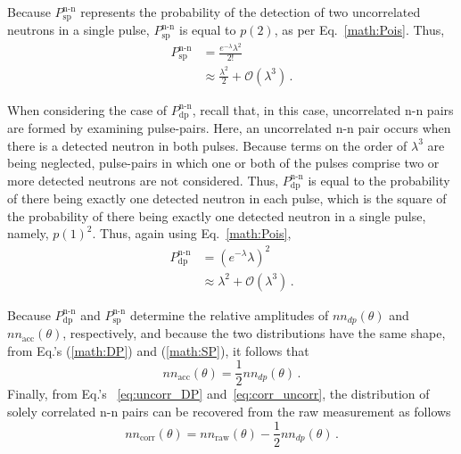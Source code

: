 Because $P^{\text{n-n}}_{\text{sp}}$ represents the probability of the detection of two uncorrelated neutrons in a single pulse, $P^{\text{n-n}}_{\text{sp}}$ is equal to $p(2)$, as per Eq.~\ref{math:Pois}.
Thus, 
\begin{equation} \label{math:SP}
    \begin{split}
    P^{\text{n-n}}_{\text{sp}} & = \frac{e^{-\lambda}\lambda^{2}}{2!} \\
        &\approx \frac{\lambda^2}{{2}} + \mathcal{O}(\lambda^3) \, .
    \end{split}
\end{equation}

When considering the case of $P^{\text{n-n}}_{\text{dp}}$, recall that, in this case, uncorrelated n-n pairs are formed by examining pulse-pairs.
Here, an uncorrelated n-n pair occurs when there is a detected neutron in both pulses.
Because terms on the order of $\lambda^{3}$ are being neglected, pulse-pairs in which one or both of the pulses comprise two or more detected neutrons are not considered. 
Thus, $P^{\text{n-n}}_{\text{dp}}$ is equal to the probability of there being exactly one detected neutron in each pulse, which is the square of the probability of there being exactly one detected neutron in a single pulse, namely, $p(1)^2$. %
Thus, again using Eq.~\ref{math:Pois},
\begin{equation} \label{math:DP}
    \begin{split}
  P^{\text{n-n}}_{\text{dp}}&= \left(e^{-\lambda}\lambda\right)^{2} \\
    &\approx \lambda^2 + \mathcal{O}(\lambda^3) \, .
    \end{split}
\end{equation}

Because $P^{\text{n-n}}_{\text{dp}}$ and $P^{\text{n-n}}_{\text{sp}}$ determine the relative amplitudes of $nn_{dp}(\theta)$ and $nn_{\text{acc}}(\theta)$, respectively, and because the two distributions have the same shape, from Eq.'s (\ref{math:DP}) and (\ref{math:SP}), it follows that
\begin{equation}
\label{eq:uncorr_DP}
nn_{\text{acc}}(\theta) = \frac{1}{2}nn_{dp}(\theta) \,.
\end{equation}
Finally, from Eq.'s ~\ref{eq:uncorr_DP} and~\ref{eq:corr_uncorr}, the distribution of solely correlated n-n pairs can be recovered from the raw measurement as follows
\begin{equation}
\label{math:acc_final}
nn_{\text{corr}}(\theta) = nn_{\text{raw}}(\theta) - \frac{1}{2}nn_{dp}(\theta) \,.
\end{equation}
